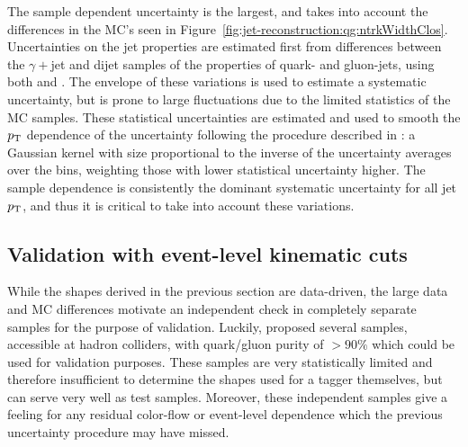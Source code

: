 The sample dependent uncertainty is the largest, and takes into account the differences in the MC's seen in Figure~\ref{fig:jet-reconstruction:qg:ntrkWidthClos}. 
Uncertainties on the jet properties are estimated first from differences
between the $\gamma+$jet and dijet samples of the properties of quark- and gluon-jets, using both \Pythia and \Herwigpp. The envelope of these
variations is used to estimate a systematic uncertainty, but is prone to large fluctuations due to the limited statistics of the MC samples. These statistical 
uncertainties
are estimated and used to smooth the $p_{\text{T}}$ dependence of the uncertainty following the
procedure described in \cite{JES2011}: a Gaussian kernel with size proportional to the inverse of the uncertainty averages over the \pt bins, weighting those with lower statistical uncertainty higher. 
The sample dependence is consistently the dominant systematic uncertainty for all jet $p_{\text{T}}$, and thus it is critical to take into account these variations.

\subsection{Validation with event-level kinematic cuts}
\label{jet-reconstruction:qg:validation}

While the shapes derived in the previous section are data-driven, the large data and MC differences motivate an independent check in completely separate samples for the purpose of validation. Luckily, \cite{schwartz2} proposed several samples, accessible at hadron colliders, with quark/gluon purity of $> 90\%$ which could be used for validation purposes. These samples are very statistically limited and therefore insufficient to determine the shapes used for a tagger themselves, but can serve very well as test samples. Moreover, these independent samples give a feeling for any residual color-flow or event-level dependence which the previous uncertainty procedure may have missed.

